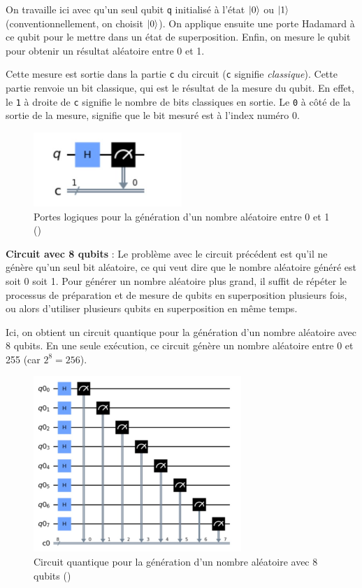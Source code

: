 \documentclass{article}
\begin{document}
On travaille ici avec qu'un seul qubit \texttt{q} initialisé à l'état $\ket{0}$ ou $\ket{1}$ (conventionnellement, on choisit $\ket{0}$).
On applique ensuite une porte Hadamard à ce qubit pour le mettre dans un état de superposition. 
Enfin, on mesure le qubit pour obtenir un résultat aléatoire entre 0 et 1. 

Cette mesure est sortie dans la partie \texttt{c} du circuit (\texttt{c} signifie \textit{classique}).
Cette partie renvoie un bit classique, qui est le résultat de la mesure du qubit. En effet,
le \texttt{1} à droite de \texttt{c} signifie le nombre de bits classiques en sortie. Le \texttt{0}
à côté de la sortie de la mesure, signifie que le bit mesuré est à l'index numéro 0.


\begin{figure}[H]
  \centering
  \includegraphics[width=0.5\textwidth]{img/portesLogiquesRandom.png}
  \caption{Portes logiques pour la génération d'un nombre aléatoire entre 0 et 1 (\cite{sapTrueRandomness})}
\end{figure}

\textbf{Circuit avec 8 qubits} :
Le problème avec le circuit précédent est qu'il ne génère qu'un seul bit aléatoire, ce qui veut dire que le nombre aléatoire généré est soit 0 soit 1. 
Pour générer un nombre aléatoire plus grand, il suffit de répéter le processus de préparation et de mesure de qubits en superposition plusieurs fois,
ou alors d'utiliser plusieurs qubits en superposition en même temps.

Ici, on obtient un circuit quantique pour la génération d'un nombre aléatoire avec 8 qubits.
En une seule exécution, ce circuit génère un nombre aléatoire entre 0 et 255 (car $2^8 = 256$).

\begin{figure}[H]
  \centering
  \includegraphics[width=0.7\textwidth]{img/portesLogiquesRandom8.png}
  \caption{Circuit quantique pour la génération d'un nombre aléatoire avec 8 qubits (\cite{sapTrueRandomness})}
\end{figure}
\end{document}
